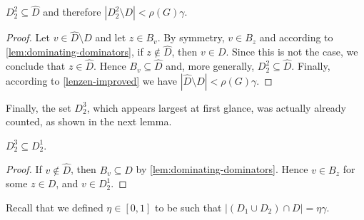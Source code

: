 \begin{lemma}\label{lem:size-D22}
  $D_2^2 \subseteq \hat D$ and therefore
  $|D_2^2\setminus D|< \rho(G)\gamma$.
\end{lemma}
\begin{proof}
  Let $v\in \hat{D}\setminus D$ and let $z\in B_v$. By symmetry,
  $v\in B_z$ and according to \cref{lem:dominating-dominators}, if
  $z\not\in \hat{D}$, then $v\in D$.  Since this is not the case, we
  conclude that $z\in\hat{D}$.  Hence $B_v\subseteq \hat{D}$ and, more
  generally, $D_2^2\subseteq \hat{D}$.  Finally, according to
  \cref{lenzen-improved} we have $|\hat{D}\setminus D|<\rho(G)\gamma$.
\end{proof}

Finally, the set $D_2^3$, which appears largest at first glance, was
actually already counted, as shown in the next lemma.
\begin{lemma}\label{lem:size-D23}
  $D_2^3\subseteq D_2^1$.
\end{lemma}
\begin{proof}
  If $v\not\in \hat{D}$, then $B_v\subseteq D$ by
  \cref{lem:dominating-dominators}.  Hence $v\in B_z$ for some
  $z\in D$, and $v\in D_2^1$.
\end{proof}

Recall that we defined $\eta\in [0,1]$ to be such that $|(D_1 \cup D_2)\cap D| =\eta\gamma$.

%


